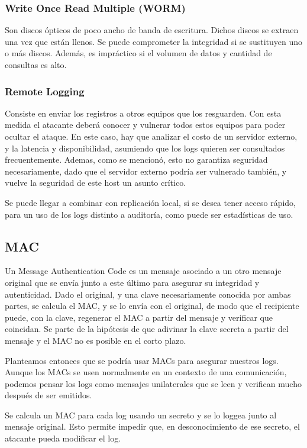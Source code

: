 \subsubsection{Write Once Read Multiple (WORM)}
Son discos ópticos de poco ancho de banda de escritura. Dichos discos se extraen una vez que
están llenos. Se puede comprometer la integridad si se sustituyen uno o más discos. Además, es impráctico si el volumen de datos y cantidad de consultas es alto.

\subsubsection{Remote Logging}
Consiste en enviar los registros a otros equipos que los resguarden. Con esta medida el atacante deberá conocer y vulnerar todos estos equipos para poder ocultar el ataque. En este caso, hay que analizar el costo de un servidor externo, y la latencia y disponibilidad, asumiendo que los logs quieren ser consultados frecuentemente. Ademas, como se mencionó, esto no garantiza seguridad necesariamente, dado que el servidor externo podría ser vulnerado también, y vuelve la seguridad de este host un asunto crítico.

Se puede llegar a combinar con replicación local, si se desea tener acceso rápido, para un uso de los logs distinto a auditoría, como puede ser estadísticas de uso.


\subsection{MAC}
Un Message Authentication Code es un mensaje asociado a un otro mensaje original que se envía junto a este último para asegurar su integridad y autenticidad. Dado el original, y una clave necesariamente conocida por ambas partes, se calcula el MAC, y se lo envía con el original, de modo que el recipiente puede, con la clave, regenerar el MAC a partir del mensaje y verificar que coincidan.	Se parte de la hipótesis de que adivinar la clave secreta a partir del mensaje y el MAC no es posible en el corto plazo.

Planteamos entonces que se podría usar MACs para asegurar nuestros logs. Aunque los MACs se usen normalmente en un contexto de una comunicación, podemos pensar los logs como mensajes unilaterales que se leen y verifican mucho después de ser emitidos.

Se calcula un MAC para cada log usando un secreto y se lo loggea junto al mensaje original. Esto permite impedir que, en desconocimiento de ese secreto, el atacante pueda modificar el log.

